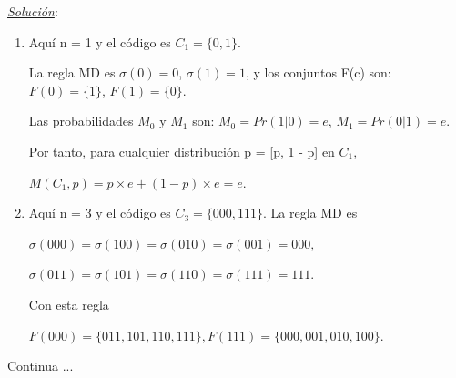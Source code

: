 \documentclass{beamer}
\theoremstyle{plain}
\theoremstyle{example}
\theoremstyle{example}
\begin{document}
\begin{frame}  \footnotesize
\textit{\underline{Solución}}:\\

\begin{enumerate}
\item Aquí n = 1 y el código es $C_1 = \{0,1\}$. 

\vspace{0.2cm}

La regla MD es $\sigma(0) = 0$, $\sigma(1) = 1$, y los conjuntos F(c) son:
$F(0) = \{1\}$, $F(1) = \{0\}$.

\vspace{0.2cm}

Las probabilidades $M_0$ y $M_1$ son: $M_0 =Pr(1|0)=e$,	$M_1 =Pr(0|1)=e$.

Por tanto, para cualquier distribución p = [p, 1 - p] en $C_1$, 

\begin{center}
$M (C_1 , p) = p \times e + (1 - p) \times e = e$.
\end{center}


\vspace{0.5cm}

\item Aquí n = 3 y el código es $C_3= \{000,111\}$. La regla MD es

\begin{center}
$\sigma(000) = \sigma(100) = \sigma(010) = \sigma(001) = 000,$ 
\end{center}
\begin{center}
$\sigma(011) = \sigma(101) = \sigma(110) = \sigma(111) = 111.$
\end{center}

Con esta regla 

\begin{center}
$F(000) = \{011, 101, 110, 111\},	F (111) = \{000, 001, 010, 100\}.$
\end{center}

\end{enumerate}

Continua ...

\end{frame} 
\end{document}
